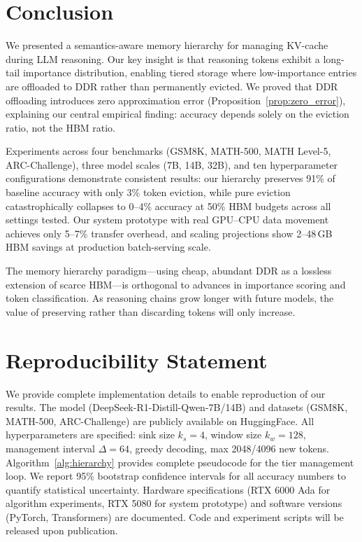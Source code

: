 \documentclass{article}
\begin{document}
\section{Conclusion}
\label{sec:conclusion}

We presented a semantics-aware memory hierarchy for managing KV-cache during LLM reasoning.
Our key insight is that reasoning tokens exhibit a long-tail importance distribution, enabling tiered storage where low-importance entries are offloaded to DDR rather than permanently evicted.
We proved that DDR offloading introduces zero approximation error (Proposition~\ref{prop:zero_error}), explaining our central empirical finding: accuracy depends solely on the eviction ratio, not the HBM ratio.

Experiments across four benchmarks (GSM8K, MATH-500, MATH Level-5, ARC-Challenge), three model scales (7B, 14B, 32B), and ten hyperparameter configurations demonstrate consistent results: our hierarchy preserves 91\% of baseline accuracy with only 3\% token eviction, while pure eviction catastrophically collapses to 0--4\% accuracy at 50\% HBM budgets across all settings tested.
Our system prototype with real GPU--CPU data movement achieves only 5--7\% transfer overhead, and scaling projections show 2--48\,GB HBM savings at production batch-serving scale.

The memory hierarchy paradigm---using cheap, abundant DDR as a lossless extension of scarce HBM---is orthogonal to advances in importance scoring and token classification.
As reasoning chains grow longer with future models, the value of preserving rather than discarding tokens will only increase.


\section*{Reproducibility Statement}

We provide complete implementation details to enable reproduction of our results.
The model (DeepSeek-R1-Distill-Qwen-7B/14B) and datasets (GSM8K, MATH-500, ARC-Challenge) are publicly available on HuggingFace.
All hyperparameters are specified: sink size $k_s{=}4$, window size $k_w{=}128$, management interval $\Delta{=}64$, greedy decoding, max 2048/4096 new tokens.
Algorithm~\ref{alg:hierarchy} provides complete pseudocode for the tier management loop.
We report 95\% bootstrap confidence intervals for all accuracy numbers to quantify statistical uncertainty.
Hardware specifications (RTX 6000 Ada for algorithm experiments, RTX 5080 for system prototype) and software versions (PyTorch, Transformers) are documented.
Code and experiment scripts will be released upon publication.
\end{document}
